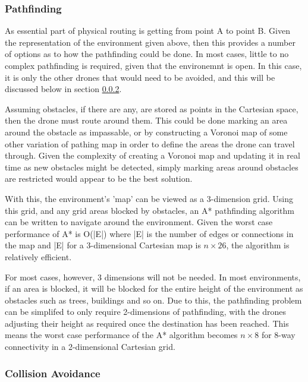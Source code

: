 		\subsubsection{Pathfinding}
\label{sec:design_physicalrouting_pathfinding}
		
As essential part of physical routing is getting from point A to point B. Given the representation of the environment given above, then this provides a number of options as to how the pathfinding could be done. In most cases, little to no complex pathfinding is required, given that the environemnt is open. In this case, it is only the other drones that would need to be avoided, and this will be discussed below in section \ref{sec:design_physicalrouting_collisionavoidance}.

Assuming obstacles, if there are any, are stored as points in the Cartesian space, then the drone must route around them. This could be done marking an area around the obstacle as impassable, or by constructing a Voronoi map of some other variation of pathing map in order to define the areas the drone can travel through. Given the complexity of creating a Voronoi map and updating it in real time as new obstacles might be detected, simply marking areas around obstacles are restricted would appear to be the best solution.

With this, the environment's 'map' can be viewed as a 3-dimension grid. Using this grid, and any grid areas blocked by obstacles, an A* pathfinding algorithm can be written to navigate around the environment. Given the worst case performance of A* is O(|E|) where |E| is the number of edges or connections in the map and |E| for a 3-dimensional Cartesian map is $n \times 26$, the algorithm is relatively efficient.

For most cases, however, 3 dimensions will not be needed. In most environments, if an area is blocked, it will be blocked for the entire height of the environment as obstacles such as trees, buildings and so on. Due to this, the pathfinding problem can be simplifed to only require 2-dimensions of pathfinding, with the drones adjusting their height as required once the destination has been reached. This means the worst case performance of the A* algorithm becomes $n \times 8$ for 8-way connectivity in a 2-dimensional Cartesian grid.

		\subsubsection{Collision Avoidance}	\label{sec:design_physicalrouting_collisionavoidance}
		
